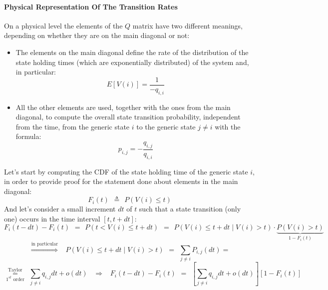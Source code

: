 \documentclass[12pt,a4paper]{article}
\begin{document}
\paragraph{Physical Representation Of The Transition Rates}
On a physical level the elements of the $Q$ matrix have two different meanings, depending on whether they are on the main diagonal or not:
\begin{itemize}
\item The elements on the main diagonal define the rate of the distribution of the state holding times (which are exponentially distributed) of the system and, in particular:
$$
E\left[V(i)\right]=\frac{1}{-q_{i,i}}
$$
\item All the other elements are used, together with the ones from the main diagonal, to compute the overall state transition probability, independent from the time, from the generic state $i$ to the generic state $j\neq i$ with the formula:
$$
p_{i,j}=-\frac{q_{i,j}}{q_{i,i}}
$$
\end{itemize}
Let's start by computing the CDF of the state holding time of the generic state $i$, in order to provide proof for the statement done about elements in the main diagonal:
$$
F_i(t)\hspace{5pt}\triangleq\hspace{5pt}
P\left( V(i)\leq t \right)
$$
And let's consider a small increment $dt$ of $t$ such that a state transition (only one) occurs in the time interval $[t,t+dt]$:
$$
F_i(t-dt)-F_i(t)\hspace{5pt}=\hspace{5pt}
P\left( t < V(i) \leq t+dt\right)\hspace{5pt}=\hspace{5pt}
P\left(V(i) \leq t+dt \mid  V(i)>t \right)\cdot 
\underbrace{P\left(V(i)>t\right)}_{1-F_i(t)}
$$
$$
\overset{\textrm{in particular}}{\Rightarrow}\hspace{10pt}
P\left(V(i) \leq t+dt \mid  V(i)>t \right)
\hspace{5pt}=\hspace{5pt}
\sum_{j\neq i}{P_{i,j}(dt)}
=
$$
$$
\overset{\textrm{Taylor}}{\underset{1^{st}\textrm{ order}}{=}}
\hspace{5pt}
\sum_{j\neq i}{q_{i,j}dt+o(dt)}
\hspace{10pt}
\Rightarrow
\hspace{10pt}
F_i(t-dt)-F_i(t)
\hspace{5pt}=\hspace{5pt}
\left[
\sum_{j\neq i}{q_{i,j}dt+o(dt)}
\right]
\left[
1-F_i(t)
\right]
$$ 
\end{document}
